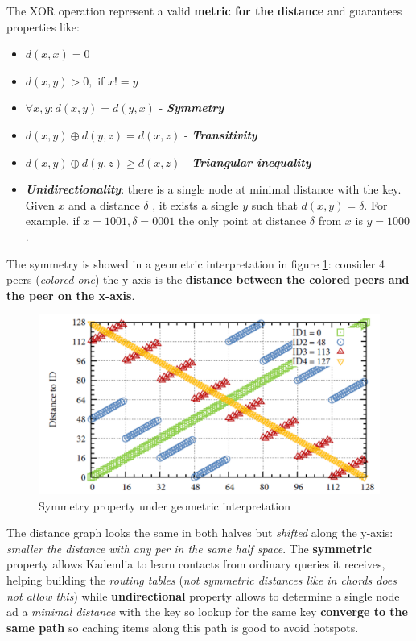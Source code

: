 \documentclass[10pt,a4paper]{report}
\begin{document}
The XOR operation represent a valid \textbf{metric for the distance} and guarantees properties like:
\begin{itemize}
	\item 
	$d(x,x) = 0$
	\item 
	$d(x,y) > 0,$ if $x!=y$
	\item 
	$\forall x,y: d(x,y) = d(y,x)$ - \textit{\textbf{Symmetry}}
	\item 
	$d(x,y) \oplus d(y,z) = d(x,z)$ - \textit{\textbf{Transitivity}}
	\item 
	$d(x,y) \oplus d(y,z) \geq d(x,z)$ - \textit{\textbf{Triangular inequality}}
	\item 
	\textit{\textbf{Unidirectionality}}: there is a single node at minimal distance with the key.
	Given $x$ and a distance $\delta$ , it exists a single $y$ such that $d(x,y) = \delta$. For example, if $x=1001, \delta=0001$ the only point at distance $\delta$ from $x$ is $y = 1000$.
\end{itemize}

The symmetry is showed in a geometric interpretation in figure \ref{symm-geometric}: consider 4 peers (\textit{colored one}) the y-axis is the \textbf{distance between the colored peers and the peer on the x-axis}.
\begin{figure}
	\centering
	\includegraphics[scale=0.30]{images/Pasted image 20230304104327.png}
	\caption{Symmetry property under geometric interpretation}
	\label{symm-geometric}
\end{figure}

The distance graph looks the same in both halves but \textit{shifted} along the y-axis: \textit{smaller the distance with any per in the same half space}.
The \textbf{symmetric} property allows Kademlia to learn contacts from ordinary queries it receives, helping building the \textit{routing tables} (\textit{not symmetric distances like in chords does not allow this}) while \textbf{undirectional} property allows to determine a single node ad a \textit{minimal distance} with the key so lookup for the same key \textbf{converge to the same path} so caching items along this path is good to avoid hotspots.
\end{document}
